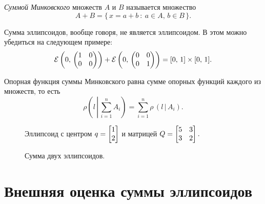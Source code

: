 \begin{definition}
        \textit{Суммой Минковского} множеств $A$ и $B$ называется множество
$$
        A + B
        =
        \{\,
x = a + b \::\: a \in A,\,b \in B 
        \,\}.
$$
\end{definition}

\begin{remark}
        Сумма эллипсоидов, вообще говоря, не является эллипсоидом.
        В этом можно убедиться на следующем примере:
$$
        \mathcal{E}\left(
                0,\,
                \begin{pmatrix}
                        1 & 0 \\
                        0 & 0
                \end{pmatrix}
        \right)
        +
        \mathcal{E}\left(
                0,\,
                \begin{pmatrix}
                        0 & 0 \\
                        0 & 1
                \end{pmatrix}
        \right)
        =
        [0 ,\, 1] \times [0 ,\, 1].
$$
\end{remark}

\begin{assertion}
        Опорная функция суммы Минковского равна сумме опорных функций каждого из множеств, то есть
$$
        \rho\left(l\,\left|\,\sum_{i=1}^n A_i\right.\right) = \sum_{i=1}^n \rho\,(l\,|\,A_i).
$$
\end{assertion}

\clearpage
\begin{figure}[t]
        \centering
        
        \caption{Эллипсоид с центром $q = \protect\begin{bmatrix}1\\2\protect\end{bmatrix}$ и матрицей $Q = \protect\begin{bmatrix}5&3\\3&2\protect\end{bmatrix}.$}
\end{figure}
\begin{figure}[b]
        \centering
        
        \caption{Сумма двух эллипсоидов.}
\end{figure}

\clearpage
\section{Внешняя оценка суммы эллипсоидов}

